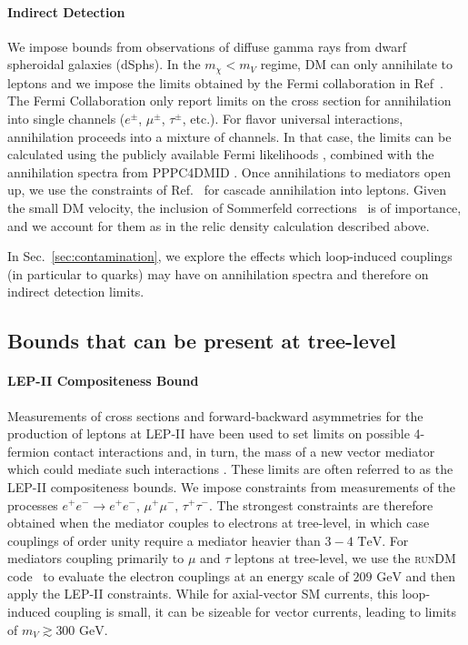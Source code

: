 \documentclass[final,5p,twocolumn]{elsarticle}
\newcommand{\runDM}{\textsc{runDM}\xspace}
\begin{document}
\paragraph{Indirect Detection} We impose bounds from observations of diffuse gamma rays from dwarf spheroidal galaxies (dSphs). In the $m_\chi < m_V$ regime, DM can only annihilate to leptons and we impose the limits obtained by the Fermi collaboration in Ref~\cite{Ackermann:2015zua}. The Fermi Collaboration only report limits on the cross section for annihilation into single channels ($e^\pm$, $\mu^\pm$, $\tau^\pm$, etc.). For flavor universal interactions, annihilation proceeds into a mixture of channels. In that case, the limits can be calculated using the publicly available Fermi likelihoods \cite{FermiLikelihood}, combined with the annihilation spectra from \textsc{PPPC4DMID} \cite{Cirelli:2010xx,Ciafaloni:2010ti}.  Once annihilations to mediators open up, we use the constraints of Ref.~\cite{Elor:2015bho} for cascade annihilation into leptons. Given the small DM velocity, the inclusion of Sommerfeld corrections~\cite{Hisano:2004ds} is of importance, and we account for them as in the relic density calculation described above. 


In Sec.~\ref{sec:contamination}, we explore the effects which loop-induced couplings (in particular to quarks) may have on annihilation spectra and therefore on indirect detection limits.

\subsection{Bounds that can be present at tree-level}

\vspace{0.2cm}

\paragraph{LEP-II Compositeness Bound} Measurements of cross sections and forward-backward asymmetries for the production of leptons at LEP-II have been used to set limits on possible 4-fermion contact interactions and, in turn, the mass of a new vector mediator which could mediate such interactions \cite{LEP:2003aa}. These limits are often referred to as the LEP-II compositeness bounds. We impose constraints from measurements of the processes $e^+e^- \rightarrow e^+e^-, \, \mu^+ \mu^-,\, \tau^+ \tau^-$. The strongest constraints are therefore obtained when the mediator couples to electrons at tree-level, in which case couplings of order unity require a mediator heavier than $3 - 4 \,\,\mathrm{TeV}$. For mediators coupling primarily to $\mu$ and $\tau$ leptons at tree-level, we use the \runDM code~\cite{runDM} to evaluate the electron couplings at an energy scale of $209 \,\,\mathrm{GeV}$ and then apply the LEP-II constraints. While for axial-vector SM currents, this loop-induced coupling is small, it can be sizeable for vector currents, leading to limits of $m_V \gtrsim 300 \,\, \mathrm{GeV}$.
\end{document}
